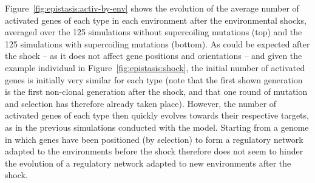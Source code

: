 Figure~\ref{fig:epistasis:activ-by-env} shows the evolution of the average number of activated genes of each type in each environment after the environmental shocks, averaged over the 125 simulations without supercoiling mutations (top) and the 125 simulations with supercoiling mutations (bottom).
As could be expected after the shock -- as it does not affect gene positions and orientations -- and given the example individual in Figure~\ref{fig:epistasis:shock}, the initial number of activated genes is initially very similar for each type (note that the first shown generation is the first non-clonal generation after the shock, and that one round of mutation and selection has therefore already taken place).
However, the number of activated genes of each type then quickly evolves towards their respective targets, as in the previous simulations conducted with the model.
Starting from a genome in which genes have been positioned (by selection) to form a regulatory network adapted to the environments before the shock therefore does not seem to hinder the evolution of a regulatory network adapted to new environments after the shock.

